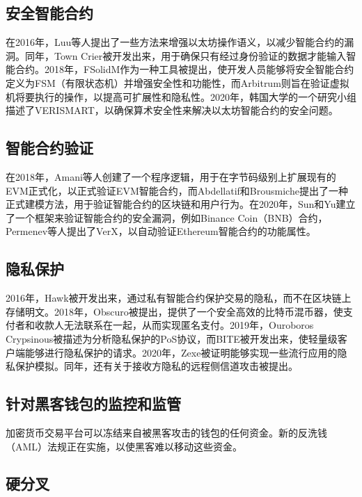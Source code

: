 \begin{translation}
\subsection{安全智能合约}

在2016年，Luu等人提出了一些方法来增强以太坊操作语义，以减少智能合约的漏洞\cite{art92}。同年，Town Crier被开发出来，用于确保只有经过身份验证的数据才能输入智能合约\cite{art112}。2018年，FSolidM作为一种工具被提出，使开发人员能够将安全智能合约定义为FSM（有限状态机）并增强安全性和功能性\cite{art113}，而Arbitrum则旨在验证虚拟机将要执行的操作，以提高可扩展性和隐私性\cite{art114}。2020年，韩国大学的一个研究小组描述了VERISMART，以确保算术安全性来解决以太坊智能合约的安全问题\cite{art115}。

\subsection{智能合约验证}

在2018年，Amani等人创建了一个程序逻辑，用于在字节码级别上扩展现有的EVM正式化，以正式验证EVM智能合约\cite{art116}，而Abdellatif和Brousmiche提出了一种正式建模方法，用于验证智能合约的区块链和用户行为\cite{art117}。在2020年，Sun和Yu建立了一个框架来验证智能合约的安全漏洞，例如Binance Coin（BNB）合约\cite{art118}，Permenev等人提出了VerX，以自动验证Ethereum智能合约的功能属性\cite{art119}。

\subsection{隐私保护}

2016年，Hawk被开发出来，通过私有智能合约保护交易的隐私，而不在区块链上存储明文\cite{art120}。2018年，Obscuro被提出，提供了一个安全高效的比特币混币器，使支付者和收款人无法联系在一起，从而实现匿名支付\cite{art121}。2019年，Ouroboros Crypsinous被描述为分析隐私保护的PoS协议\cite{art122}，而BITE被开发出来，使轻量级客户端能够进行隐私保护的请求\cite{art123}。2020年，Zexe被证明能够实现一些流行应用的隐私保护模拟\cite{art124}。同年，还有关于接收方隐私的远程侧信道攻击被提出\cite{art125}。

\subsection{针对黑客钱包的监控和监管}

加密货币交易平台可以冻结来自被黑客攻击的钱包的任何资金。新的反洗钱（AML）法规正在实施，以使黑客难以移动这些资金\cite{art126}。

\subsection{硬分叉}


\end{translation}
